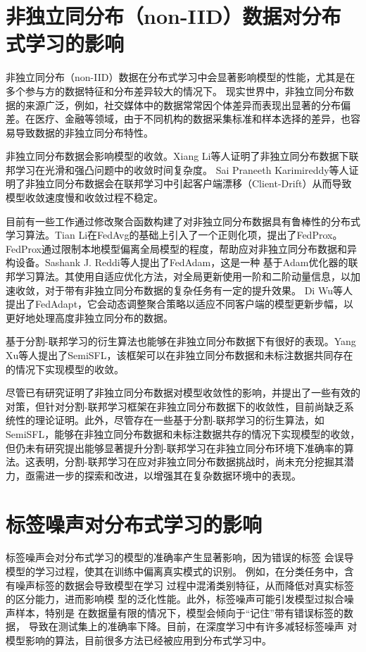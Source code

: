 \section{非独立同分布（non-IID）数据对分布式学习的影响}
非独立同分布（non-IID）数据在分布式学习中会显著影响模型的性能，尤其是在多个参与方的数据特征和分布差异较大的情况下\cite{zhu2021federated,amiri2022impact}。
现实世界中，非独立同分布数据的来源广泛，例如，社交媒体中的数据常常因个体差异而表现出显著的分布偏差。在医疗、金融等领域，由于不同机构的数据采集标准和样本选择的差异，也容易导致数据的非独立同分布特性。


非独立同分布数据会影响模型的收敛。Xiang Li等人证明了非独立同分布数据下联邦学习在光滑和强凸问题中的收敛时间复杂度\cite{li2019convergence}。
Sai Praneeth Karimireddy等人证明了非独立同分布数据会在联邦学习中引起客户端漂移（Client-Drift）从而导致
模型收敛速度慢和收敛过程不稳定\cite{karimireddy2020scaffold}。

目前有一些工作通过修改聚合函数构建了对非独立同分布数据具有鲁棒性的分布式学习算法。Tian Li在FedAvg的基础上引入了一个正则化项，提出了FedProx\cite{li2020federated}。
FedProx通过限制本地模型偏离全局模型的程度，帮助应对非独立同分布数据和异构设备。Sashank J. Reddi等人提出了FedAdam\cite{reddi2020adaptive}，这是一种
基于Adam优化器的联邦学习算法。其使用自适应优化方法，对全局更新使用一阶和二阶动量信息，以加速收敛，对于带有非独立同分布数据的复杂任务有一定的提升效果。
Di Wu等人提出了FedAdapt\cite{wu2022fedadapt}，它会动态调整聚合策略以适应不同客户端的模型更新步幅，以更好地处理高度非独立同分布的数据。


基于分割-联邦学习的衍生算法也能够在非独立同分布数据下有很好的表现。Yang Xu等人提出了SemiSFL\cite{xu2023semisfl}，该框架可以在非独立同分布数据和未标注数据共同存在的情况下实现模型的收敛。

尽管已有研究证明了非独立同分布数据对模型收敛性的影响，并提出了一些有效的对策，但针对分割-联邦学习框架在非独立同分布数据下的收敛性，目前尚缺乏系统性的理论证明。此外，尽管存在一些基于分割-联邦学习的衍生算法，如 SemiSFL，能够在非独立同分布数据和未标注数据共存的情况下实现模型的收敛，但仍未有研究提出能够显著提升分割-联邦学习在非独立同分布环境下准确率的算法。这表明，分割-联邦学习在应对非独立同分布数据挑战时，尚未充分挖掘其潜力，亟需进一步的探索和改进，以增强其在复杂数据环境中的表现。
\section{标签噪声对分布式学习的影响}
标签噪声会对分布式学习的模型的准确率产生显著影响，因为错误的标签
会误导模型的学习过程，使其在训练中偏离真实模式的识别\cite{liang2023fednoisy,jiang2024fnbench}。
例如，在分类任务中，含有噪声标签的数据会导致模型在学习
过程中混淆类别特征，从而降低对真实标签的区分能力，进而影响模
型的泛化性能。此外，标签噪声可能引发模型过拟合噪声样本，特别是
在数据量有限的情况下，模型会倾向于“记住”带有错误标签的数据，
导致在测试集上的准确率下降。目前，在深度学习中有许多减轻标签噪声
对模型影响的算法，目前很多方法已经被应用到分布式学习中。

